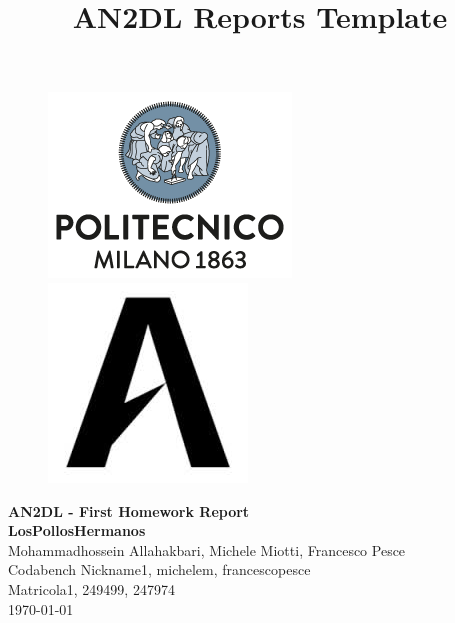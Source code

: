 \documentclass[11pt]{article}
\title{AN2DL Reports Template}
\begin{document}
\begin{figure}[H]
      \raggedright
      \includegraphics[scale=0.4]{polimi.png} \hfill
      \includegraphics[scale=0.3]{airlab.jpeg}
\end{figure}

\vspace{5mm}

\begin{center}
      {\Large \textbf{AN2DL - First Homework Report}}\\
      \vspace{2mm}
      {\Large \textbf{LosPollosHermanos}}\\
      \vspace{2mm}
      {\large Mohammadhossein Allahakbari,}
      {\large Michele Miotti,}
      {\large Francesco Pesce}\\
      \vspace{2mm}
      {Codabench Nickname1,}
      {michelem,}
      {francescopesce}\\
      \vspace{2mm}
      {Matricola1,}
      {249499,}
      {247974}\\
      \vspace{5mm}
      \today
\end{center}
\vspace{5mm}
\end{document}

